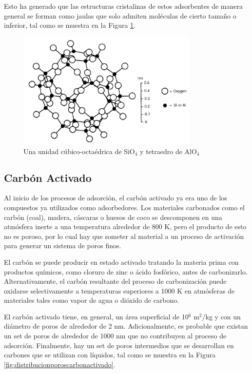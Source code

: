 \documentclass[11pt]{book}
\begin{document}
Esto ha generado que las estructuras cristalinas de estos adsorbentes de manera general se forman como jaulas que solo admiten moléculas de cierto tamaño o inferior, tal como se muestra en la Figura \ref{fig:estructuraadsorbedor}. 

\begin{figure}[H]
    \centering
    \includegraphics[width=9cm]{img/adsorcion/EstructuraAdsorbedor.PNG}
    \caption{Una unidad cúbico-octaédrica de SiO$_4$ y tetraedro de AlO$_4$}
    \label{fig:estructuraadsorbedor}
\end{figure}

\subsection{Carbón Activado}

Al inicio de los procesos de adsorción, el carbón activado ya era uno de los compuestos ya utilizados como adsorbedores. Los materiales carbonados como el carbón (coal), madera, cáscaras o huesos de coco se descomponen en una atmósfera inerte a una temperatura alrededor de 800 K, pero el producto de esto no es poroso, por lo cual hay que someter al material a un proceso de activación para generar un sistema de poros finos. 

El carbón se puede producir en estado activado tratando la materia prima con productos químicos, como cloruro de zinc o ácido fosfórico, antes de carbonizarlo. Alternativamente, el carbón resultante del proceso de carbonización puede oxidarse selectivamente a temperaturas superiores a 1000 K en atmósferas de materiales tales como vapor de agua o dióxido de carbono.

El carbón activado tiene, en general, un área superficial de 10$^6$ m$^2$/kg y con un diámetro de poros de alrededor de 2 nm. Adicionalmente, es probable que existan un set de poros de alrededor de 1000 nm que no contribuyen al proceso de adsorción. Finalmente, hay un set de poros intermedios que se desarrollan en carbones que se utilizan con líquidos, tal como se muestra en la Figura \ref{fig:distribucionporoscarbonactivado}.
\end{document}
